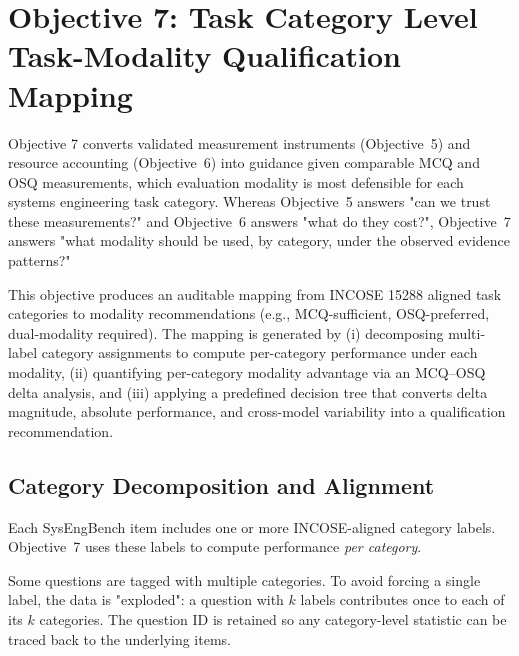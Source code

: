 
\section{Objective 7: Task Category Level Task-Modality Qualification Mapping}
\label{sec:ch3_obj7_category_taskmodality}

Objective 7 converts validated measurement instruments (Objective~5) and resource accounting (Objective~6) into guidance given comparable MCQ and OSQ measurements, which evaluation modality is most defensible for each systems engineering task category. Whereas Objective~5 answers "can we trust these measurements?" and Objective~6 answers "what do they cost?", Objective~7 answers "what modality should be used, by category, under the observed evidence patterns?"

This objective produces an auditable mapping from INCOSE 15288 aligned task categories to modality recommendations (e.g., MCQ-sufficient, OSQ-preferred, dual-modality required). The mapping is generated by (i) decomposing multi-label category assignments to compute per-category performance under each modality, (ii) quantifying per-category modality advantage via an MCQ--OSQ delta analysis, and (iii) applying a predefined decision tree that converts delta magnitude, absolute performance, and cross-model variability into a qualification recommendation.


\subsection{Category Decomposition and Alignment}
\label{subsec:ch3_obj7_category_decomposition}

Each SysEngBench item includes one or more INCOSE-aligned category labels. Objective~7 uses these labels to compute performance \emph{per category}.

Some questions are tagged with multiple categories. To avoid forcing a single label, the data is "exploded": a question with $k$ labels contributes once to each of its $k$ categories. The question ID is retained so any category-level statistic can be traced back to the underlying items.

